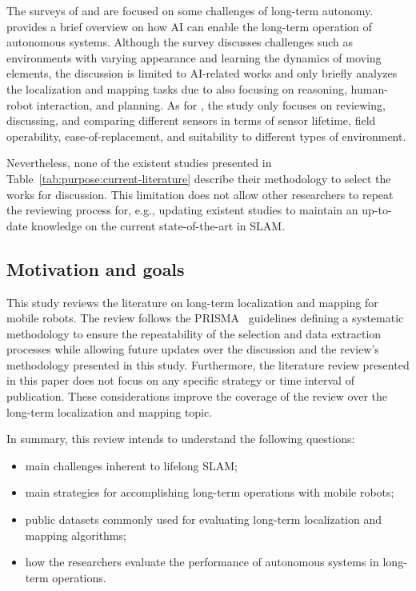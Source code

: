 The surveys of \cite{purpose:study:kunze:2018} and \cite{purpose:study:zaffar:2018} are focused on some challenges of long-term autonomy. 
\cite{purpose:study:kunze:2018} provides a brief overview on how AI can enable the long-term operation of autonomous systems. Although the survey discusses challenges such as environments with varying appearance and learning the dynamics of moving elements, the discussion is limited to AI-related works and only briefly analyzes the localization and mapping tasks due to also focusing on reasoning, human-robot interaction, and planning.
As for \cite{purpose:study:zaffar:2018}, the study only focuses on reviewing, discussing, and comparing different sensors in terms of sensor lifetime, field operability, ease-of-replacement, and suitability to different types of environment.

Nevertheless, none of the existent studies presented in Table~\ref{tab:purpose:current-literature} describe their methodology to select the works for discussion. This limitation does not allow other researchers to repeat the reviewing process for, e.g., updating existent studies to maintain an up-to-date knowledge on the current state-of-the-art in SLAM.





\subsection{Motivation and goals}

This study reviews the literature on long-term localization and mapping for mobile robots. The review follows the PRISMA~\parencite{methodology:prisma} guidelines defining a systematic methodology to ensure the repeatability of the selection and data extraction processes while allowing future updates over the discussion and the review's methodology presented in this study. 
Furthermore, the literature review presented in this paper does not focus on any specific strategy or time interval of publication. These considerations improve the coverage of the review over the long-term localization and mapping topic.

In summary, this review intends to understand the following questions:

\begin{itemize}[nosep]
\item main challenges inherent to lifelong SLAM;
\item main strategies for accomplishing long-term operations with mobile robots;
\item public datasets commonly used for evaluating long-term localization and mapping algorithms;
\item how the researchers evaluate the performance of autonomous systems in long-term operations.
\end{itemize}

